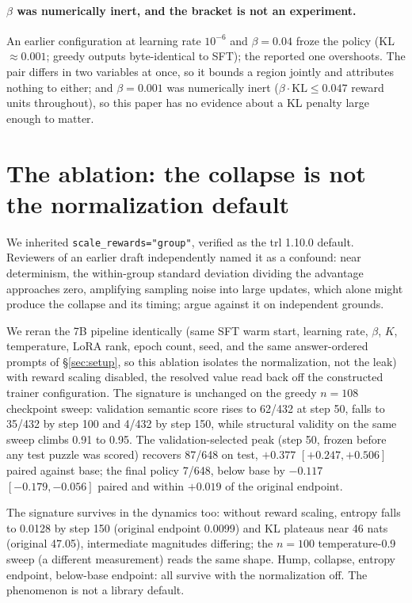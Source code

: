 \documentclass{article}
\begin{document}
\paragraph{$\beta$ was numerically inert, and the bracket is not an
experiment.} An earlier configuration at learning rate $10^{-6}$ and $\beta=0.04$ froze the policy (KL $\approx 0.001$; greedy outputs byte-identical to SFT); the reported one overshoots. The pair differs in two variables at once, so it bounds a region jointly and attributes nothing to either; and $\beta=0.001$ was numerically inert ($\beta \cdot \mathrm{KL} \le 0.047$ reward units throughout), so this paper has no evidence about a KL penalty large enough to matter.

\section{The ablation: the collapse is not the normalization default}
\label{sec:ablation}

We inherited \texttt{scale\_rewards="group"}, verified as the trl 1.10.0
default. Reviewers of an earlier draft independently named it as a
confound: near determinism, the within-group standard deviation dividing
the advantage approaches zero, amplifying sampling noise into large updates, which alone might produce the collapse and its timing; \citet{drgrpo} argue against it on independent grounds.

We reran the 7B pipeline identically (same SFT warm start, learning
rate, $\beta$, $K$, temperature, LoRA rank, epoch count, seed, and the same
answer-ordered prompts of \S\ref{sec:setup}, so this ablation isolates the
normalization, not the leak) with
reward scaling disabled, the resolved value read back off the constructed
trainer configuration. The signature is unchanged on the greedy
$n=108$ checkpoint sweep: validation semantic score rises to 62/432 at step
50, falls to 35/432 by step 100 and 4/432 by step 150, while structural
validity on the same sweep climbs 0.91 to 0.95. The validation-selected peak (step 50, frozen
before any test puzzle was scored) recovers 87/648 on test,
$+0.377$ $[+0.247, +0.506]$ paired against base; the final policy 7/648,
below base by $-0.117$ $[-0.179, -0.056]$ paired and within $+0.019$ of
the original endpoint.

The signature survives in the dynamics too: without reward scaling, entropy falls to 0.0128 by step 150 (original endpoint 0.0099) and KL plateaus near 46 nats (original 47.05), intermediate magnitudes differing; the $n=100$ temperature-0.9 sweep (a different measurement) reads the same shape. Hump, collapse, entropy
endpoint, below-base endpoint: all survive with the normalization off. The
phenomenon is not a library default.
\end{document}
